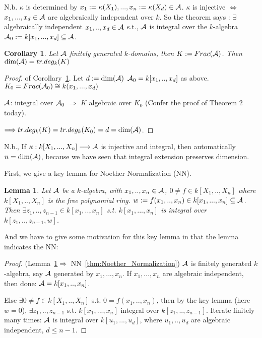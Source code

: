 \documentclass[11pt]{article}
\newtheorem{lemma}[thm]{Lemma}
\newtheorem{cor}[thm]{Corollary}
\newcommand{\cala}{{\cal A}}
\newcommand{\Lrta}{\Longrightarrow}
\newcommand{\lrta}{\longrightarrow}
\newcommand{\Llrta}{\Longleftrightarrow}
\begin{document}
N.b. $\kappa$ is determined by $x_1:=\kappa(X_1),...,x_n:=\kappa(X_d)\in\cala$. $\kappa $ is injective $\Llrta$ $x_1,...,x_d\in \cala$ are algebraically independent over $k$.  So the theorem says : $\exists$ algebraically independent $x_1,..,x_d\in \cala$ s.t., $\cala$ is integral over the $k$-algebra $\cala_0:=k[x_1,...,x_d]\subseteq \cala$.
\begin{cor}\label{cor:k-domain_dim_tr.deg}
Let $\cala$ finitely generated $k$-domains, then $K:=Frac(\cala)$. Then $\text{dim}(\cala)=tr.deg_k(K)$
\end{cor}
\begin{proof} of Corollary~\ref{cor:k-domain_dim_tr.deg}. Let $d:=\text{dim}(\cala)$ $\cala_0=k[x_1,..,x_d]$ as above. 
$K_0=Frac(\cala_0)\cong k(x_1,...,x_d)$

$\cala$: integral over $\cala_0$ $\Lrta$ $K$ algebraic over $K_0$ (Confer the proof of Theorem 2 today).

$\Lrta tr.deg_k(K)=tr.deg_k(K_0)=d=\text{dim}(\cala)$.
\end{proof}
N.b., If $\kappa: k[X_1,...,X_n]\lrta\cala$ is injective and integral, then automatically $n=\text{dim}(\cala)$, because we have seen that integral extension preserves dimension.

First, we give a key lemma for Noether Normalization (NN).
\begin{lemma}\label{lem:key_lemma_noether_normalization}
Let $\cala$ be a $k$-algebra, with $x_1,..,x_n\in \cala$, $0\neq f\in k[X_1,..,X_n]$ where $k[X_1,..,X_n]$ is the free polynomial ring. $w:=f(x_1,..,x_n)\in k[x_1,...,x_n]\subseteq \cala$. Then $\exists z_1,..,z_{n-1}\in k[x_1,..,x_n]$ s.t. $k[x_1,...,x_n]$ is integral over $k[z_1,..,z_{n-1},w]$.
\end{lemma}

And we have to give some motivation for this key lemma in that the lemma indicates the NN:
\begin{proof}(Lemma~\ref{lem:key_lemma_noether_normalization}$\Lrta$ NN~\ref{thm:Noether_Normalization}) $\cala$ is finitely generated $k$-algebra, say $\cala$ generated by $x_1,...,x_n$. If $x_1,...,x_n$ are algebraic independent, then done: $\cala=k[x_1,..,x_n]$. 

Else $\exists 0\neq f\in k[X_1,..,X_n]$ s.t. $0=f(x_1,..,x_n)$, then by the key lemma (here $w=0$), $\exists z_1,..,z_{n-1}$ s.t. $k[x_1,...,x_n]$ integral over $k[z_1,..,z_{n-1}]$. Iterate finitely many times: $\cala$ is integral over $k[u_1,...,u_d]$, where $u_1,..,u_d$ are algebraic independent, $d\leq n-1$. 
\end{proof}
\end{document}
